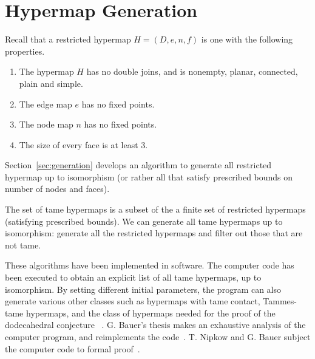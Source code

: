 \section{Hypermap Generation}

Recall that a restricted hypermap  $H = (D,e,n,f)$ is one with the following
properties.
\begin{enumerate}
\item The hypermap $H$ has no double joins, and is nonempty, planar,
  connected, plain and simple.
\item The edge map $e$ has no fixed points.  %
\item The node map $n$ has no fixed points.
\item The size of every face is at least $3$.
\end{enumerate}

Section~\ref{sec:generation} develops an algorithm to generate all
restricted hypermap up to isomorphism (or rather all that satisfy
prescribed bounds on number of nodes and faces).

The set of tame hypermaps is a subset of the a finite set of
restricted hypermaps (satisfying prescribed bounds).  We can generate
all tame hypermaps up to isomorphism: generate all the restricted
hypermaps and filter out those that are not tame.

These algorithms have been implemented in software.  The computer code
has been executed to obtain an explicit list of all tame hypermaps, up
to isomorphism.  By setting different initial parameters, the program
can also generate various other classes such as hypermaps with tame
contact, Tammes-tame hypermaps, and the class of hypermaps needed for
the proof of the dodecahedral conjecture
~\cite{unknown}. %
G. Bauer's thesis makes an exhaustive analysis of the computer
program, and reimplements the code~\cite{unknown}.  T. Nipkow and G.
Bauer subject the computer code to formal proof~\cite{unknown}.



